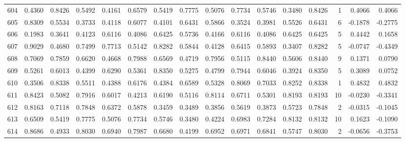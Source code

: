\begin{tabular}{lrrrrrrrrrrrrrrr}
604 &      0.4360 &  0.8426 &  0.5492 &  0.4161 &  0.6579 &  0.5419 &  0.7775 &  0.5076 &  0.7734 &  0.5746 &   0.3480 &     0.8426 &      1 &                    0.4066 &                     0.4066 \\
605 &      0.8309 &  0.5534 &  0.3733 &  0.4118 &  0.6077 &  0.4101 &  0.6431 &  0.5866 &  0.3524 &  0.3981 &   0.5526 &     0.6431 &      6 &                   -0.1878 &                    -0.2775 \\
606 &      0.1983 &  0.3641 &  0.4123 &  0.6116 &  0.4086 &  0.6425 &  0.5736 &  0.4166 &  0.6116 &  0.4086 &   0.6425 &     0.6425 &      5 &                    0.4442 &                     0.1658 \\
607 &      0.9029 &  0.4680 &  0.7499 &  0.7713 &  0.5142 &  0.8282 &  0.5844 &  0.4128 &  0.6415 &  0.5893 &   0.3407 &     0.8282 &      5 &                   -0.0747 &                    -0.4349 \\
608 &      0.7069 &  0.7859 &  0.6620 &  0.4668 &  0.7988 &  0.6569 &  0.4719 &  0.7956 &  0.5115 &  0.8440 &   0.5606 &     0.8440 &      9 &                    0.1371 &                     0.0790 \\
609 &      0.5261 &  0.6013 &  0.4399 &  0.6290 &  0.5361 &  0.8350 &  0.5275 &  0.4799 &  0.7944 &  0.6046 &   0.3924 &     0.8350 &      5 &                    0.3089 &                     0.0752 \\
610 &      0.3506 &  0.8338 &  0.5511 &  0.4388 &  0.6176 &  0.4384 &  0.6589 &  0.5328 &  0.8069 &  0.7033 &   0.8252 &     0.8338 &      1 &                    0.4832 &                     0.4832 \\
611 &      0.8423 &  0.5082 &  0.7916 &  0.6017 &  0.4213 &  0.6190 &  0.5116 &  0.8114 &  0.6711 &  0.5301 &   0.8193 &     0.8193 &     10 &                   -0.0230 &                    -0.3341 \\
612 &      0.8163 &  0.7118 &  0.7848 &  0.6372 &  0.5878 &  0.3459 &  0.3489 &  0.3856 &  0.5619 &  0.3873 &   0.5723 &     0.7848 &      2 &                   -0.0315 &                    -0.1045 \\
613 &      0.6509 &  0.5419 &  0.7775 &  0.5076 &  0.7734 &  0.5746 &  0.3480 &  0.4224 &  0.6983 &  0.7284 &   0.8132 &     0.8132 &     10 &                    0.1623 &                    -0.1090 \\
614 &      0.8686 &  0.4933 &  0.8030 &  0.6940 &  0.7987 &  0.6680 &  0.4199 &  0.6952 &  0.6971 &  0.6841 &   0.5747 &     0.8030 &      2 &                   -0.0656 &                    -0.3753 \\

\end{tabular}
